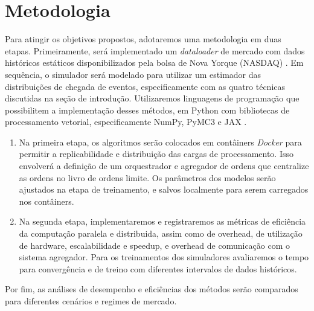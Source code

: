 \chapter{Metodologia}

Para atingir os objetivos propostos, adotaremos uma metodologia em duas etapas. Primeiramente, será implementado um \textit{dataloader} de mercado com dados históricos estáticos disponibilizados pela bolsa de Nova Yorque (NASDAQ) \citep{Nagy2023}. Em sequência, o simulador será modelado para utilizar um estimador das distribuições de chegada de eventos, especificamente com as quatro técnicas discutidas na seção de introdução. Utilizaremos linguagens de programação que possibilitem a implementação desses métodos, em Python com bibliotecas de processamento vetorial, especificamente NumPy, PyMC3 e JAX \citep{Bradbury2018, Oriol2023}.

\begin{enumerate}
	\item Na primeira etapa, os algoritmos serão colocados em contâiners \textit{Docker} para permitir a replicabilidade e distribuição das cargas de processamento. Isso envolverá a definição de um orquestrador e agregador de ordens que centralize as ordens no livro de ordens limite. Os parâmetros dos modelos serão ajustados na etapa de treinamento, e salvos localmente para serem carregados nos contâiners.
	
	\item Na segunda etapa, implementaremos e registraremos as métricas de eficiência da computação paralela e distribuida, assim como de overhead, de utilização de hardware, escalabilidade e speedup, e overhead de comunicação com o sistema agregador. Para os treinamentos dos simuladores avaliaremos o tempo para convergência e de treino com diferentes intervalos de dados históricos.
\end{enumerate}

Por fim, as análises de desempenho e eficiências dos métodos serão comparados para diferentes cenários e regimes de mercado.
